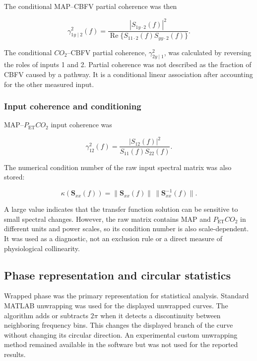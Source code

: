 \documentclass[12pt]{article}
\newcommand{\PETCOtwo}{P_{\mathrm{ET}}CO_2}
\newcommand{\COtwo}{CO_2}
\newcommand{\Real}{\operatorname{Re}}
\begin{document}
The conditional MAP--CBFV partial coherence was then

\begin{equation}
    \gamma^2_{1y\mid2}(f)=
    \frac{|S_{1y\cdot2}(f)|^2}
    {\Real\{S_{11\cdot2}(f)S_{yy\cdot2}(f)\}}.
    \label{eq:partial_map}
\end{equation}

The conditional $\COtwo$--CBFV partial coherence, $\gamma^2_{2y\mid1}$, was
calculated by reversing the roles of inputs 1 and 2. Partial coherence was not
described as the fraction of CBFV caused by a pathway. It is a conditional
linear association after accounting for the other measured input.

\subsubsection{Input coherence and conditioning}

MAP--$\PETCOtwo$ input coherence was

\begin{equation}
    \gamma^2_{12}(f)=
    \frac{|S_{12}(f)|^2}{S_{11}(f)S_{22}(f)}.
    \label{eq:input_coherence}
\end{equation}

The numerical condition number of the raw input spectral matrix was also
stored:

\begin{equation}
    \kappa\!\left(\mathbf{S}_{xx}(f)\right)
    =\|\mathbf{S}_{xx}(f)\|\,
    \|\mathbf{S}_{xx}^{-1}(f)\|.
    \label{eq:condition_number}
\end{equation}

A large value indicates that the transfer function solution can be sensitive
to small spectral changes. However, the raw matrix contains MAP and
$\PETCOtwo$ in different units and power scales, so its condition number is
also scale-dependent. It was used as a diagnostic, not an exclusion rule or a
direct measure of physiological collinearity.

\subsection{Phase representation and circular statistics}

Wrapped phase was the primary representation for statistical analysis.
Standard MATLAB unwrapping was used for the displayed unwrapped curves. The
algorithm adds or subtracts $2\pi$ when it detects a discontinuity between
neighboring frequency bins. This changes the displayed branch of the curve
without changing its circular direction. An experimental custom unwrapping
method remained available in the software but was not used for the reported
results.
\end{document}

